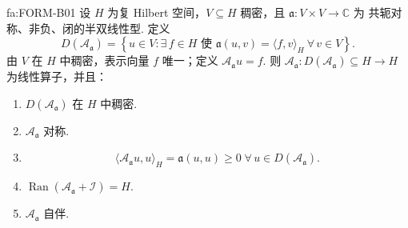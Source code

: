 \begin{FATheorem}[B][闭非负型的关联自伴算子]{fa:FORM-B01}
设 \(\displaystyle H\) 为复 Hilbert 空间，\(\displaystyle V\subseteq H\) 稠密，且 \(\displaystyle\mathfrak a:V\times V\to\mathbb C\) 为 共轭对称、非负、闭的半双线性型. 定义
\[
D(\mathcal A_{\mathfrak a})
=
\left\{
u\in V:
\exists\,f\in H\text{ 使 }\mathfrak a(u,v)=\langle f,v\rangle_H
\ \forall\,v\in V
\right\}.
\]
由 \(\displaystyle V\) 在 \(\displaystyle H\) 中稠密，表示向量 \(\displaystyle f\) 唯一；定义 \(\displaystyle\mathcal A_{\mathfrak a}u=f\). 则 \(\displaystyle\mathcal A_{\mathfrak a}:D(\mathcal A_{\mathfrak a})\subseteq H\to H\) 为线性算子，并且：
\begin{enumerate}[label=\textnormal{(\roman*)}]
\item \(\displaystyle D(\mathcal A_{\mathfrak a})\) 在 \(\displaystyle H\) 中稠密.
\item \(\displaystyle\mathcal A_{\mathfrak a}\) 对称.
\item
\[
\langle\mathcal A_{\mathfrak a}u,u\rangle_H
=
\mathfrak a(u,u)
\geqslant0
\;
\forall\,u\in D(\mathcal A_{\mathfrak a}).
\]
\item
\(\displaystyle \operatorname{Ran}(\mathcal A_{\mathfrak a}+\mathcal I)=H.\)
\item \(\displaystyle\mathcal A_{\mathfrak a}\) 自伴.
\end{enumerate}
\end{FATheorem}


